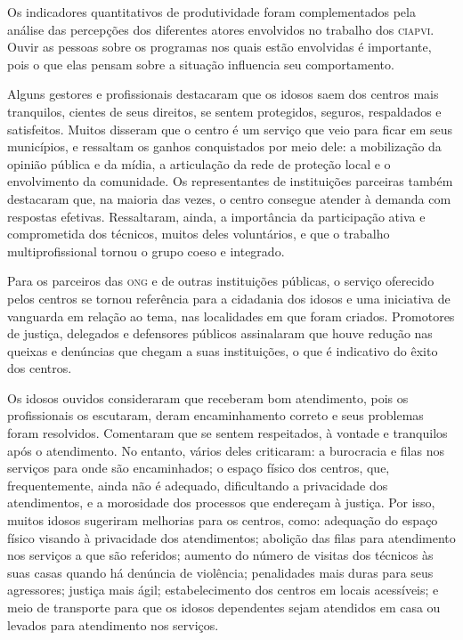 \documentclass{article}
\begin{document}
Os indicadores quantitativos de produtividade foram complementados pela análise
das percepções dos diferentes atores envolvidos no trabalho dos \textsc{ciapvi}. Ouvir as
pessoas sobre os programas nos quais estão envolvidas é importante, pois o que
elas pensam sobre a situação influencia seu comportamento.

Alguns gestores e profissionais destacaram que os idosos saem dos centros mais
tranquilos, cientes de seus direitos, se sentem protegidos, seguros, respaldados
e satisfeitos. Muitos disseram que o centro é um serviço que veio para ficar em
seus municípios, e ressaltam os ganhos conquistados por meio dele: a mobilização
da opinião pública e da mídia, a articulação da rede de proteção local e o
envolvimento da comunidade. Os representantes de instituições parceiras também
destacaram que, na maioria das vezes, o centro consegue atender à demanda com
respostas efetivas. Ressaltaram, ainda, a importância da participação ativa e
comprometida dos técnicos, muitos deles voluntários, e que o trabalho
multiprofissional tornou o grupo coeso e integrado.

Para os parceiros das \textsc{ong} e de outras instituições públicas, o serviço oferecido
pelos centros se tornou referência para a cidadania dos idosos e uma iniciativa
de vanguarda em relação ao tema, nas localidades em que foram criados.
Promotores de justiça, delegados e defensores públicos assinalaram que houve
redução nas queixas e denúncias que chegam a suas instituições, o que é
indicativo do êxito dos centros.

Os idosos ouvidos consideraram que receberam bom atendimento, pois os
profissionais os escutaram, deram encaminhamento correto e seus problemas foram
resolvidos. Comentaram que se sentem respeitados, à vontade e tranquilos após o
atendimento. No entanto, vários deles criticaram: a burocracia e filas nos
serviços para onde são encaminhados; o espaço físico dos centros, que,
frequentemente, ainda não é adequado, dificultando a privacidade dos
atendimentos, e a morosidade dos processos que endereçam à justiça. Por isso,
muitos idosos sugeriram melhorias para os centros, como: adequação do espaço
físico visando à privacidade dos atendimentos; abolição das filas para
atendimento nos serviços a que são referidos; aumento do número de visitas dos
técnicos às suas casas quando há denúncia de violência; penalidades mais duras
para seus agressores; justiça mais ágil; estabelecimento dos centros em locais
acessíveis; e meio de transporte para que os idosos dependentes sejam atendidos
em casa ou levados para atendimento nos serviços.
\end{document}
